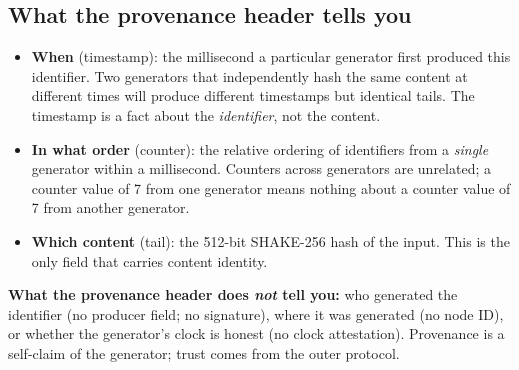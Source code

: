 \subsection{What the provenance header tells you}

\begin{itemize}
\item \textbf{When} (timestamp): the millisecond a particular generator first produced this identifier. Two generators that independently hash the same content at different times will produce different timestamps but identical tails. The timestamp is a fact about the \emph{identifier}, not the content.
\item \textbf{In what order} (counter): the relative ordering of identifiers from a \emph{single} generator within a millisecond. Counters across generators are unrelated; a counter value of 7 from one generator means nothing about a counter value of 7 from another generator.
\item \textbf{Which content} (tail): the 512-bit SHAKE-256 hash of the input. This is the only field that carries content identity.
\end{itemize}

\textbf{What the provenance header does \emph{not} tell you:} who generated the identifier (no producer field; no signature), where it was generated (no node ID), or whether the generator's clock is honest (no clock attestation). Provenance is a self-claim of the generator; trust comes from the outer protocol.
